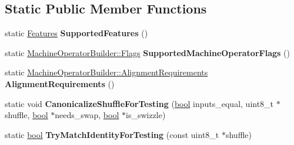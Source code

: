 \subsection*{Static Public Member Functions}
\begin{DoxyCompactItemize}
\item 
\mbox{\label{classv8_1_1internal_1_1compiler_1_1InstructionSelector_ab5ee2fe198b50a28b6e9d03cf26b79cb}} 
static \mbox{\hyperlink{classv8_1_1internal_1_1compiler_1_1InstructionSelector_1_1Features}{Features}} {\bfseries Supported\+Features} ()
\item 
\mbox{\label{classv8_1_1internal_1_1compiler_1_1InstructionSelector_aa31dee7be3b35a108712f2913a598ca0}} 
static \mbox{\hyperlink{classv8_1_1base_1_1Flags}{Machine\+Operator\+Builder\+::\+Flags}} {\bfseries Supported\+Machine\+Operator\+Flags} ()
\item 
\mbox{\label{classv8_1_1internal_1_1compiler_1_1InstructionSelector_a0c9aed886a7ff7e2bd9cc055574af334}} 
static \mbox{\hyperlink{classv8_1_1internal_1_1compiler_1_1MachineOperatorBuilder_1_1AlignmentRequirements}{Machine\+Operator\+Builder\+::\+Alignment\+Requirements}} {\bfseries Alignment\+Requirements} ()
\item 
\mbox{\label{classv8_1_1internal_1_1compiler_1_1InstructionSelector_aec51ace585d53ef6e6e171b2af80344a}} 
static void {\bfseries Canonicalize\+Shuffle\+For\+Testing} (\mbox{\hyperlink{classbool}{bool}} inputs\+\_\+equal, uint8\+\_\+t $\ast$shuffle, \mbox{\hyperlink{classbool}{bool}} $\ast$needs\+\_\+swap, \mbox{\hyperlink{classbool}{bool}} $\ast$is\+\_\+swizzle)
\item 
\mbox{\label{classv8_1_1internal_1_1compiler_1_1InstructionSelector_a63b4e878ca8e8f24d7df9e5f776c1b7e}} 
static \mbox{\hyperlink{classbool}{bool}} {\bfseries Try\+Match\+Identity\+For\+Testing} (const uint8\+\_\+t $\ast$shuffle)
\item 
\mbox{\label{classv8_1_1internal_1_1compiler_1_1InstructionSelector_a8b0b3e084ef35332231cb7b72f85fe2a}} 

\end{DoxyCompactItemize}
